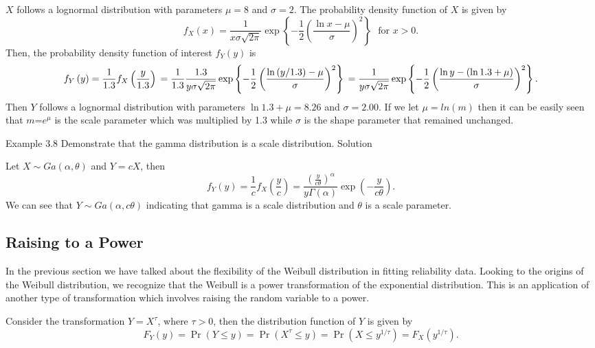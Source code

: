 \documentclass[]{book}
\begin{document}
\(X\) follows a lognormal distribution with parameters \(\mu = 8\) and
\(\sigma = 2\). The probability density function of \(X\) is given by
\[f_{X}\left( x \right) = \frac{1}{x \sigma \sqrt{2\pi}}\exp \left\{- \frac{1}{2}\left( \frac{\ln x - \mu}{\sigma} \right)^{2}\right\} \ \ \ \text{for } x > 0.\]
Then, the probability density function of interest \(f_{Y}(y)\) is
\[f_{Y}\left( y \right) = \frac{1}{1.3}f_{X}\left( \frac{y}{1.3} \right) \\
= \frac{1}{1.3}\frac{1.3}{y \sigma \sqrt{2\pi}}\exp \left\{- \frac{1}{2}\left( \frac{\ln\left( y/1.3 \right) - \mu}{\sigma} \right)^{2}\right\} \\
= \frac{1}{y \sigma\sqrt{2\pi}}\exp \left\{- \frac{1}{2}\left( \frac{\ln y - \left( \ln 1.3 + \mu \right)}{\sigma} \right)^{2}\right\}.\]
Then \(Y\) follows a lognormal distribution with parameters
\(\ln 1.3 + \mu = 8.26\) and \(\sigma = 2.00\). If we let
\(\mu = ln(m)\) then it can be easily seen that \(m\)=\(e^{\mu}\) is the
scale parameter which was multiplied by 1.3 while \(\sigma\) is the
shape parameter that remained unchanged.

Example 3.8 Demonstrate that the gamma distribution is a scale
distribution. Solution

Let \(X\sim Ga(\alpha,\theta)\) and \(Y = cX\), then
\[f_{Y}\left( y \right) = \frac{1}{c}f_{X}\left( \frac{y}{c} \right) = \frac{\left( \frac{y}{c\theta} \right)^{\alpha}}{y\Gamma\left( \alpha \right)}\exp \left( - \frac{y}{c\theta} \right)  .\]
We can see that \(Y\sim Ga(\alpha,c\theta)\) indicating that gamma is a
scale distribution and \(\theta\) is a scale parameter.

\subsection{Raising to a Power}\label{raising-to-a-power}

In the previous section we have talked about the flexibility of the
Weibull distribution in fitting reliability data. Looking to the origins
of the Weibull distribution, we recognize that the Weibull is a power
transformation of the exponential distribution. This is an application
of another type of transformation which involves raising the random
variable to a power.

Consider the transformation \(Y = X^{\tau}\), where \(\tau > 0\), then
the distribution function of \(Y\) is given by
\[F_{Y}\left( y \right) = \Pr\left( Y \leq y \right) = \Pr\left( X^{\tau} \leq y \right) = \Pr\left( X \leq y^{1/ \tau} \right) = F_{X}\left( y^{1/ \tau} \right).\]
\end{document}
